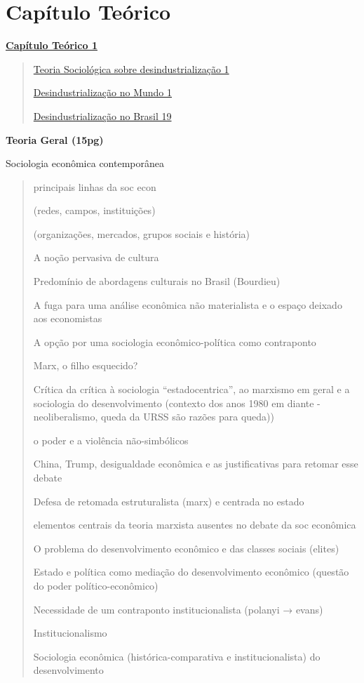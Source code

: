 \section{Capítulo Teórico}\label{capuxedtulo-teuxf3rico}

\hyperref[capuxedtulo-teuxf3rico]{\textbf{Capítulo Teórico 1}}

\begin{quote}
\hyperref[teoria-socioluxf3gica-sobre-desindustrializauxe7uxe3o]{Teoria
Sociológica sobre desindustrialização 1}

\hyperref[desindustrializauxe7uxe3o-no-mundo]{Desindustrialização no
Mundo 1}

\hyperref[desindustrializauxe7uxe3o-no-brasil]{Desindustrialização no
Brasil 19}
\end{quote}

\textbf{Teoria Geral (15pg)}

Sociologia econômica contemporânea

\begin{quote}
principais linhas da soc econ

(redes, campos, instituições)

(organizações, mercados, grupos sociais e história)

A noção pervasiva de cultura

Predomínio de abordagens culturais no Brasil (Bourdieu)

A fuga para uma análise econômica não materialista e o espaço deixado
aos economistas

A opção por uma sociologia econômico-política como contraponto

Marx, o filho esquecido?

Crítica da crítica à sociologia ``estadocentrica'', ao marxismo em geral
e a sociologia do desenvolvimento (contexto dos anos 1980 em diante
-neoliberalismo, queda da URSS são razões para queda))

o poder e a violência não-simbólicos

China, Trump, desigualdade econômica e as justificativas para retomar
esse debate

Defesa de retomada estruturalista (marx) e centrada no estado

elementos centrais da teoria marxista ausentes no debate da soc
econômica

O problema do desenvolvimento econômico e das classes sociais (elites)

Estado e política como mediação do desenvolvimento econômico (questão do
poder político-econômico)

Necessidade de um contraponto institucionalista (polanyi → evans)

Institucionalismo

Sociologia econômica (histórica-comparativa e institucionalista) do
desenvolvimento
\end{quote}

